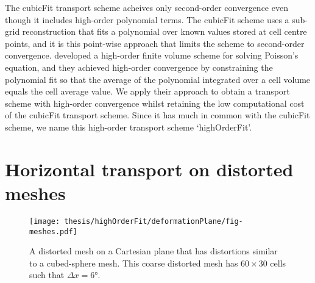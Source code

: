 

The cubicFit transport scheme acheives only second-order convergence even though it includes high-order polynomial terms.
The cubicFit scheme uses a sub-grid reconstruction that fits a polynomial over known values stored at cell centre points, and it is this point-wise approach that limits the scheme to second-order convergence.
\citet{devendran2017} developed a high-order finite volume scheme for solving Poisson’s equation, and they achieved high-order convergence by constraining the polynomial fit so that the average of the polynomial integrated over a cell volume equals the cell average value.
We apply their approach to obtain a transport scheme with high-order convergence whilst retaining the low computational cost of the cubicFit transport scheme.
Since it has much in common with the cubicFit scheme, we name this high-order transport scheme `highOrderFit'.



\section{Horizontal transport on distorted meshes}

\begin{figure}
	\centering
	\texttt{[image: thesis/highOrderFit/deformationPlane/fig-meshes.pdf]}
	\caption{A distorted mesh on a Cartesian plane that has distortions similar to a cubed-sphere mesh.  This coarse distorted mesh has $60 \times 30$ cells such that $\Delta x = \ang{6}$.}
	\label{fig:highOrderFit:deformationPlane:mesh}
\end{figure}

